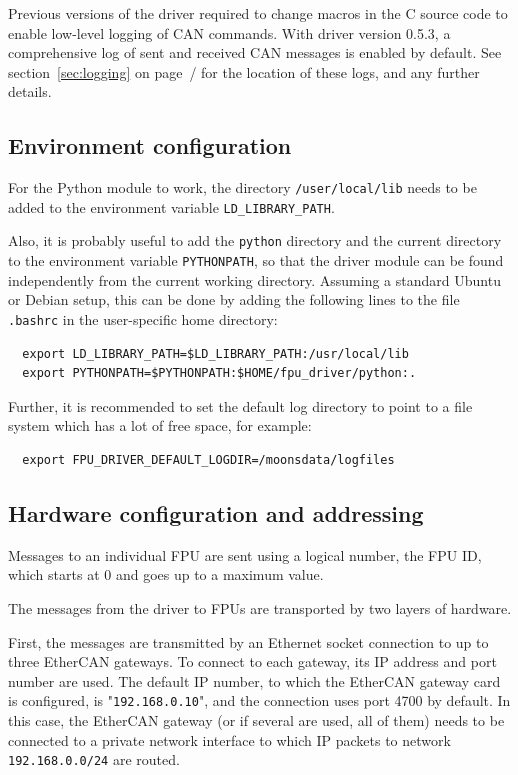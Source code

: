 \documentclass[11pt,a4paper]{scrartcl}
\begin{document}
Previous versions of the driver required to change macros in the C
source code to enable low-level logging of CAN commands.  With driver
version 0.5.3, a comprehensive log of sent and received CAN messages
is enabled by default. See section~\ref{sec:logging} on
page~/\pageref{sec:logging} for the location of these logs, and any
further details.


\subsection{Environment configuration}
For the Python module to work, the directory \texttt{/user/local/lib}
needs to be added to the environment variable
\texttt{LD\_LIBRARY\_PATH}.

Also, it is probably useful to add the \texttt{python} directory and
the current directory to the environment variable \texttt{PYTHONPATH},
so that the driver module can be found independently from the current
working directory.  Assuming a standard Ubuntu or Debian setup, this
can be done by adding the following lines to the file \texttt{.bashrc}
in the user-specific home directory:

\begin{verbatim}
  export LD_LIBRARY_PATH=$LD_LIBRARY_PATH:/usr/local/lib
  export PYTHONPATH=$PYTHONPATH:$HOME/fpu_driver/python:.
\end{verbatim}

Further, it is recommended to set the default log directory to point
to a file system which has a lot of free space, for example:
\begin{verbatim}
  export FPU_DRIVER_DEFAULT_LOGDIR=/moonsdata/logfiles
\end{verbatim}


\subsection{Hardware configuration and addressing}
Messages to an individual FPU are sent using a logical number, the FPU
ID, which starts at 0 and goes up to a maximum value.

The messages from the driver to FPUs are transported by two layers of
hardware.

   First, the
messages are transmitted by an Ethernet socket connection to up to
three EtherCAN gateways. To connect to each gateway, its IP address
and port number are used. The default IP number, to which the EtherCAN
gateway card is configured, is "\texttt{192.168.0.10}", and the
connection uses port 4700 by default. In this case, the EtherCAN
gateway (or if several are used, all of them) needs to be connected to
a private network interface to which IP packets to network
\texttt{192.168.0.0/24} are routed.
\end{document}
